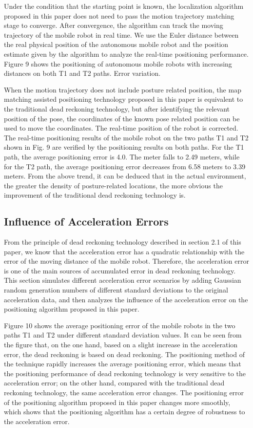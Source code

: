 \documentclass{llncs}
\begin{document}
Under the condition that the starting point is known, the localization algorithm proposed in this paper does not need to pass the motion trajectory matching stage to converge. After convergence, the algorithm can track the moving trajectory of the mobile robot in real time. We use the Euler distance between the real physical position of the autonomous mobile robot and the position estimate given by the algorithm to analyze the real-time positioning performance. Figure 9 shows the positioning of autonomous mobile robots with increasing distances on both T1 and T2 paths. Error variation.

When the motion trajectory does not include posture related position, the map matching assisted positioning technology proposed in this paper is equivalent to the traditional dead reckoning technology, but after identifying the relevant position of the pose, the coordinates of the known pose related position can be used to move the coordinates. The real-time position of the robot is corrected. The real-time positioning results of the mobile robot on the two paths T1 and T2 shown in Fig. 9 are verified by the positioning results on both paths. For the T1 path, the average positioning error is 4.0. The meter falls to 2.49 meters, while for the T2 path, the average positioning error decreases from 6.58 meters to 3.39 meters. From the above trend, it can be deduced that in the actual environment, the greater the density of posture-related locations, the more obvious the improvement of the traditional dead reckoning technology is.


\subsection{Influence of Acceleration Errors}

From the principle of dead reckoning technology described in section 2.1 of this paper, we know that the acceleration error has a quadratic relationship with the error of the moving distance of the mobile robot. Therefore, the acceleration error is one of the main sources of accumulated error in dead reckoning technology. This section simulates different acceleration error scenarios by adding Gaussian random generation numbers of different standard deviations to the original acceleration data, and then analyzes the influence of the acceleration error on the positioning algorithm proposed in this paper.

Figure 10 shows the average positioning error of the mobile robots in the two paths T1 and T2 under different standard deviation values. It can be seen from the figure that, on the one hand, based on a slight increase in the acceleration error, the dead reckoning is based on dead reckoning. The positioning method of the technique rapidly increases the average positioning error, which means that the positioning performance of dead reckoning technology is very sensitive to the acceleration error; on the other hand, compared with the traditional dead reckoning technology, the same acceleration error changes. The positioning error of the positioning algorithm proposed in this paper changes more smoothly, which shows that the positioning algorithm has a certain degree of robustness to the acceleration error.
 
\end{document}
